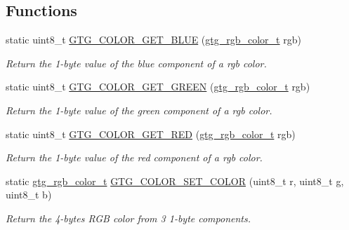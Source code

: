 \subsection*{Functions}
\begin{DoxyCompactItemize}
\item 
static uint8\-\_\-t \hyperlink{group__GTGColor_ga9e4cec241556fba74d243092ecb65ff3}{G\-T\-G\-\_\-\-C\-O\-L\-O\-R\-\_\-\-G\-E\-T\-\_\-\-B\-L\-U\-E} (\hyperlink{GTGColor_8h_a9fd3b22fc2eca7706659486c53aa1edd}{gtg\-\_\-rgb\-\_\-color\-\_\-t} rgb)
\begin{DoxyCompactList}\small\item\em Return the 1-\/byte value of the blue component of a rgb color. \end{DoxyCompactList}\item 
static uint8\-\_\-t \hyperlink{group__GTGColor_ga47cbb9a6cd672a1b0679a5472dacf0aa}{G\-T\-G\-\_\-\-C\-O\-L\-O\-R\-\_\-\-G\-E\-T\-\_\-\-G\-R\-E\-E\-N} (\hyperlink{GTGColor_8h_a9fd3b22fc2eca7706659486c53aa1edd}{gtg\-\_\-rgb\-\_\-color\-\_\-t} rgb)
\begin{DoxyCompactList}\small\item\em Return the 1-\/byte value of the green component of a rgb color. \end{DoxyCompactList}\item 
static uint8\-\_\-t \hyperlink{group__GTGColor_ga223e9945beaf02128c62c359a13381ac}{G\-T\-G\-\_\-\-C\-O\-L\-O\-R\-\_\-\-G\-E\-T\-\_\-\-R\-E\-D} (\hyperlink{GTGColor_8h_a9fd3b22fc2eca7706659486c53aa1edd}{gtg\-\_\-rgb\-\_\-color\-\_\-t} rgb)
\begin{DoxyCompactList}\small\item\em Return the 1-\/byte value of the red component of a rgb color. \end{DoxyCompactList}\item 
static \hyperlink{GTGColor_8h_a9fd3b22fc2eca7706659486c53aa1edd}{gtg\-\_\-rgb\-\_\-color\-\_\-t} \hyperlink{group__GTGColor_ga0e3d8e413dcbd8f23dfeb5b26bf02ea0}{G\-T\-G\-\_\-\-C\-O\-L\-O\-R\-\_\-\-S\-E\-T\-\_\-\-C\-O\-L\-O\-R} (uint8\-\_\-t r, uint8\-\_\-t g, uint8\-\_\-t b)
\begin{DoxyCompactList}\small\item\em Return the 4-\/bytes R\-G\-B color from 3 1-\/byte components. \end{DoxyCompactList}\end{DoxyCompactItemize}
